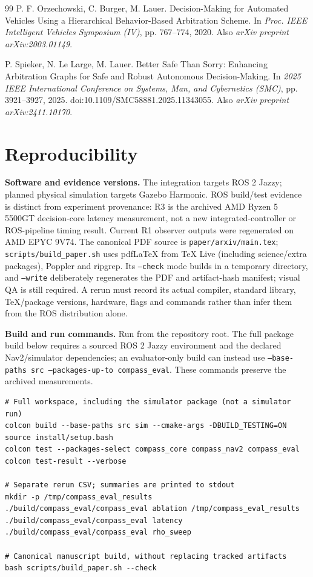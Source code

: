 \documentclass[11pt]{article}
\newcommand{\code}[1]{\texttt{#1}}
\begin{document}
\begin{thebibliography}{99}
 P. F. Orzechowski, C. Burger, M. Lauer. Decision-Making for Automated Vehicles Using a Hierarchical Behavior-Based Arbitration Scheme. In \emph{Proc. IEEE Intelligent Vehicles Symposium (IV)}, pp. 767--774, 2020. Also \emph{arXiv preprint arXiv:2003.01149}.

 P. Spieker, N. Le Large, M. Lauer. Better Safe Than Sorry: Enhancing Arbitration Graphs for Safe and Robust Autonomous Decision-Making. In \emph{2025 IEEE International Conference on Systems, Man, and Cybernetics (SMC)}, pp. 3921--3927, 2025. doi:10.1109/SMC58881.2025.11343055. Also \emph{arXiv preprint arXiv:2411.10170}.

\end{thebibliography}

\appendix
\FloatBarrier
\section{Reproducibility}

\textbf{Software and evidence versions.} The integration targets ROS 2 Jazzy; planned physical simulation targets Gazebo Harmonic. ROS build/test evidence is distinct from experiment provenance: R3 is the archived AMD Ryzen 5 5500GT decision-core latency measurement, not a new integrated-controller or ROS-pipeline timing result. Current R1 observer outputs were regenerated on AMD EPYC 9V74. The canonical PDF source is \code{paper/arxiv/main.tex}; \code{scripts/build\_paper.sh} uses pdfLaTeX from TeX Live (including science/extra packages), Poppler and ripgrep. Its \code{--check} mode builds in a temporary directory, and \code{--write} deliberately regenerates the PDF and artifact-hash manifest; visual QA is still required. A rerun must record its actual compiler, standard library, TeX/package versions, hardware, flags and commands rather than infer them from the ROS distribution alone.

\textbf{Build and run commands.} Run from the repository root. The full package build below requires a sourced ROS 2 Jazzy environment and the declared Nav2/simulator dependencies; an evaluator-only build can instead use \code{--base-paths src --packages-up-to compass\_eval}. These commands preserve the archived measurements.

\begin{verbatim}
# Full workspace, including the simulator package (not a simulator run)
colcon build --base-paths src sim --cmake-args -DBUILD_TESTING=ON
source install/setup.bash
colcon test --packages-select compass_core compass_nav2 compass_eval
colcon test-result --verbose

# Separate rerun CSV; summaries are printed to stdout
mkdir -p /tmp/compass_eval_results
./build/compass_eval/compass_eval ablation /tmp/compass_eval_results
./build/compass_eval/compass_eval latency
./build/compass_eval/compass_eval rho_sweep

# Canonical manuscript build, without replacing tracked artifacts
bash scripts/build_paper.sh --check
\end{verbatim}
\end{document}
